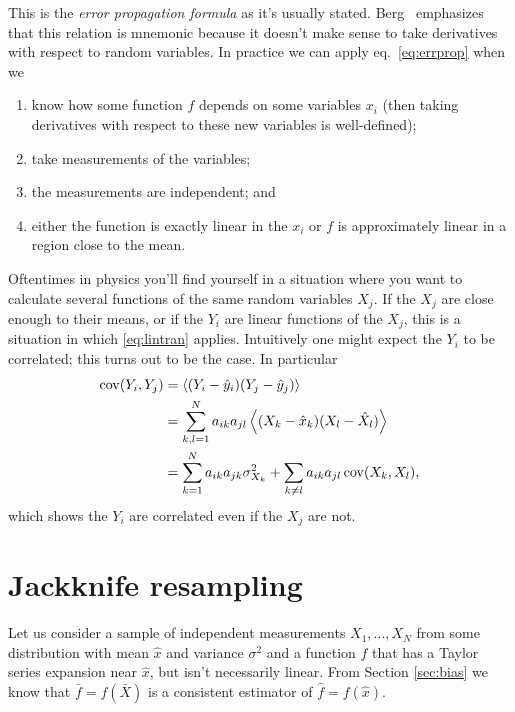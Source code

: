 This is the {\it error propagation formula} as it's usually stated. 
Berg~\cite{berg_markov_2004} emphasizes that this relation is 
mnemonic because it doesn't make 
sense to take derivatives with respect to random variables. 
In practice we can apply eq.~\eqref{eq:errprop} when we
\begin{enumerate}
  \item know how some function $f$ depends on some variables $x_i$
        (then taking derivatives with respect to these new variables
         is well-defined);
  \item take measurements of the variables;
  \item the measurements are independent; and
  \item either the function is exactly linear in the $x_i$ or $f$ is
        approximately linear in a region close to the mean.
\end{enumerate}

Oftentimes in physics you'll find yourself in a situation where you want
to calculate several functions of the same random variables $X_j$. If
the $X_j$ are close enough to their means, or if the $Y_i$ are linear
functions of the $X_j$, this is a situation in which \eqref{eq:lintran} 
applies. Intuitively one might expect the $Y_i$ to be correlated; this
turns out to be the case. In particular
\begin{equation}
  \begin{aligned}
    \Cov(Y_i,Y_j)&=\ev{(Y_i-\hat{y}_i)(Y_j-\hat{y}_j)}\\
                 &=\sum_{k,l=1}^N 
                  a_{ik}a_{jl}\ev{(X_k-\hat{x}_k)(X_l-\hat{X}_l)}\\
                 &=\sum_{k=1}^N a_{ik}a_{jk}\sigma^2_{X_k}
                   +\sum_{k\neq l} a_{ik}a_{jl}\Cov(X_k,X_l),
  \end{aligned}
\end{equation}
which shows the $Y_i$ are correlated even if the $X_j$ are not.

\section{Jackknife resampling}
Let us consider a sample of independent measurements 
$X_1,...,X_N$ from some distribution with mean $\hat{x}$ and 
variance $\sigma^2$ and a function $f$ that has a Taylor series 
expansion near $\hat{x}$, but isn't necessarily linear.
From Section \ref{sec:bias} we know that $\bar{f}=f(\bar{X})$ is
a consistent estimator of $\hat{f}=f(\hat{x})$. 

